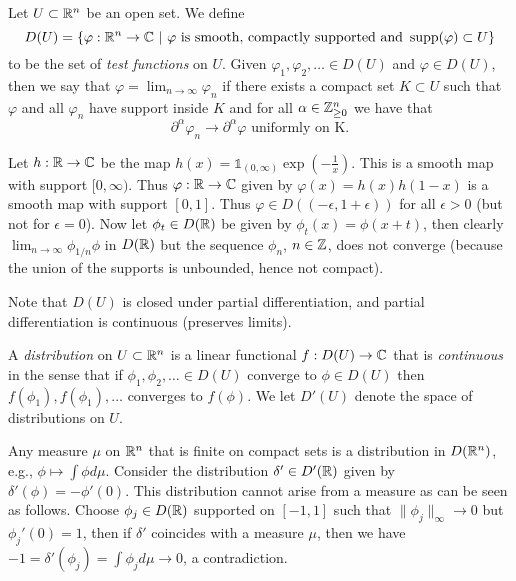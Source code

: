 \documentclass[twoside, a4paper, 10pt]{amsart}
\begin{document}
\begin{mydef} Let $U \subset \mathbb{R}^n$ be an open set. We define $$D(U) = \{ \varphi :\mathbb{R}^n \to \mathbb{C} ~|~ \varphi \text{ is smooth, compactly supported and } \operatorname{supp}(\varphi) \subset U  \}$$ to be the set of \textit{test functions} on $U$. Given $\varphi_1,\varphi_2, \ldots \in D(U)$ and $\varphi \in D(U)$, then we say that $\varphi = \lim_{n \to \infty} \varphi_n$ if there exists a compact set $K \subset U$ such that $\varphi$ and all $\varphi_n$ have support inside $K$ and for all $\alpha \in \mathbb{Z}_{\geq 0}^n$ we have that $$\partial^{\alpha} \varphi_n \to \partial^{\alpha} \varphi \text{ uniformly on K.}$$ 

\end{mydef}

\begin{eg} Let $h:\mathbb{R} \to \mathbb{C}$ be the map $h(x) = \mathds{1}_{(0,\infty)} \exp(-\frac{1}{x})$. This is a smooth map with support $[0, \infty)$. Thus $\varphi:\mathbb{R} \to \mathbb{C}$ given by $\varphi(x) = h(x)h(1-x)$ is a smooth map with support $[0,1]$. Thus $\varphi \in D((-\epsilon, 1 + \epsilon))$ for all $\epsilon >0$ (but not for $\epsilon = 0$). Now let $\phi_t \in D(\mathbb{R})$ be given by $\phi_t(x) = \phi(x+t)$, then clearly $\lim_{n \to \infty} \phi_{1/n} \phi$ in $D(\mathbb{R})$ but the sequence $\phi_n$, $n \in \mathbb{Z}$, does not converge (because the union of the supports is unbounded, hence not compact).
\end{eg}

Note that $D(U)$ is closed under partial differentiation, and partial differentiation is continuous (preserves limits).

\begin{mydef} A \textit{distribution} on $U \subset \mathbb{R}^n$ is a linear functional $f:D(U) \to \mathbb{C}$ that is \textit{continuous} in the sense that if $\phi_1, \phi_2,\ldots \in D(U)$ converge to $\phi \in D(U)$ then $f(\phi_1), f(\phi_1), \ldots$ converges to $f(\phi)$. We let $D'(U)$ denote the space of distributions on $U$. 

\end{mydef}

\begin{eg} Any measure $\mu$ on $\mathbb{R}^n$ that is finite on compact sets is a distribution in $D(\mathbb{R}^n)$, e.g., $\phi \mapsto \int \phi d\mu$. Consider the distribution $\delta' \in D'(\mathbb{R})$ given by $\delta'(\phi) = -\phi'(0)$. This distribution cannot arise from a measure as can be seen as follows. Choose $\phi_j \in D(\mathbb{R})$ supported on $[-1,1]$ such that $\| \phi_j \|_{\infty} \to 0$ but $\phi_j'(0) = 1$, then if $\delta'$ coincides with a measure $\mu$, then we have $-1 = \delta'(\phi_j) = \int \phi_j d\mu \to 0 $, a contradiction.

\end{eg}
\end{document}
